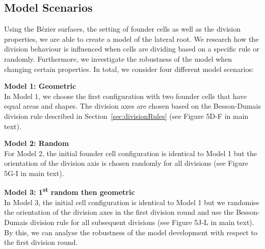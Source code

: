 \documentclass[11pt,a4paper, final]{article}
\begin{document}
\subsection{Model Scenarios}
\label{sec:modelScenarios}
\noindent
Using the B\'ezier surfaces, the setting of founder cells as well as the division properties, we are able to create a model of the lateral root. We research how the division behaviour is influenced when cells are dividing based on a specific rule or randomly. Furthermore, we investigate the robustness of the model when changing certain properties. In total, we consider four different model scenarios:

\noindent
\textbf{Model 1: Geometric}\\
\noindent
In Model 1, we choose the first configuration with two founder cells that have equal areas and shapes. The division axes are chosen based on the Besson-Dumais division rule described in Section~\ref{sec:divisionRules} (see Figure 5D-F in main text).

\noindent
\textbf{Model 2: Random}\\
\noindent
For Model 2, the initial founder cell configuration is identical to Model 1 but the orientation of the division axis is chosen randomly for all divisions (see Figure 5G-I in main text).

\noindent
\textbf{Model 3: 1\textsuperscript{st} random then geometric}\\
\noindent
In Model 3, the initial cell configuration is identical to Model 1 but we randomise the orientation of the division axes in the first division round and use the Besson-Dumais division rule for all subsequent divisions (see Figure 5J-L in main text). By this, we can analyse the robustness of the model development with respect to the first division round.
\end{document}

